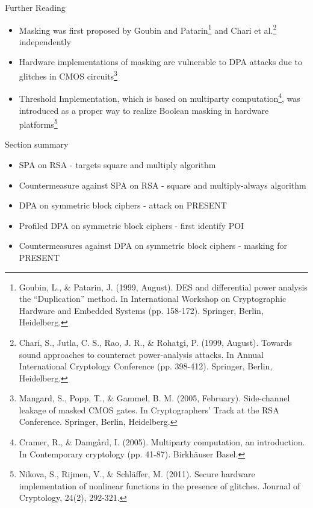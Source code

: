 \begin{frame}{Further Reading}
    \begin{itemize}
        \item Masking was first proposed by Goubin and Patarin\footnote{Goubin, L., \& Patarin, J. (1999, August). DES and differential power analysis the “Duplication” method. In International Workshop on Cryptographic Hardware and Embedded Systems (pp. 158-172). Springer, Berlin, Heidelberg.} and Chari et al.\footnote{Chari, S., Jutla, C. S., Rao, J. R., \& Rohatgi, P. (1999, August). Towards sound approaches to counteract power-analysis attacks. In Annual International Cryptology Conference (pp. 398-412). Springer, Berlin, Heidelberg.}  independently
        \item Hardware implementations of masking are vulnerable to DPA attacks due to glitches in CMOS circuits\footnote{Mangard, S., Popp, T., \& Gammel, B. M. (2005, February). Side-channel leakage of masked CMOS gates. In Cryptographers’ Track at the RSA Conference. Springer, Berlin, Heidelberg.}
        \item Threshold Implementation, which is based on multiparty computation\footnote{Cramer, R., \& Damg\r{a}rd, I. (2005). Multiparty computation, an introduction. In Contemporary cryptology (pp. 41-87). Birkh\"{a}user Basel.}, was introduced as a proper way to realize Boolean masking in hardware platforms\footnote{Nikova, S., Rijmen, V., \& Schläffer, M. (2011). Secure hardware implementation of nonlinear functions in the presence of glitches. Journal of Cryptology, 24(2), 292-321.}
    \end{itemize}
\end{frame}

\begin{frame}{Section summary}
    \begin{itemize}
        \item SPA on RSA - targets square and multiply algorithm
        \item Countermeasure against SPA on RSA - square and multiply-always algorithm
        \item DPA on symmetric block ciphers - attack on PRESENT
        \item Profiled DPA on symmetric block ciphers - first identify POI
        \item Countermeasures against DPA on symmetric block ciphers - masking for PRESENT
    \end{itemize}
\end{frame}